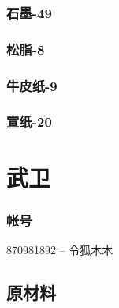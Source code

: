 \documentclass[12pt,a4paper,landscape]{article}
\begin{document}
\begin{CJK}{UTF8}{gbsn}
\subsubsection{石墨-49}
\subsubsection{松脂-8}
\subsubsection{牛皮纸-9}
\subsubsection{宣纸-20}


\section{武卫}
\subsubsection{帐号}
870981892 -- 令狐木木
\subsection{原材料}
\subsubsection{}
\subsubsection{}
\subsubsection{}
\subsubsection{}
\subsubsection{}
\subsubsection{}
\subsubsection{}
\subsubsection{}

\end{CJK}
\end{document}
